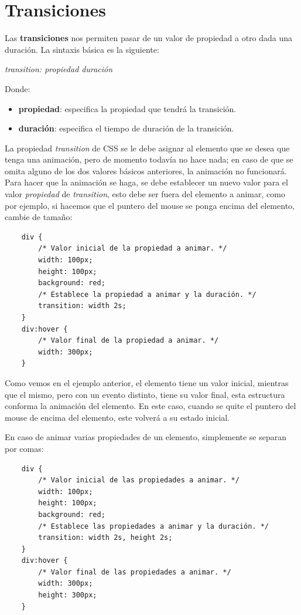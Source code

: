 \section{Transiciones}

Las \textbf{transiciones} nos permiten pasar de un valor de propiedad a otro dada una duración. La sintaxis básica es la siguiente:
\begin{center}
    \textit{transition: propiedad duración}
\end{center}

Donde:
\begin{itemize}
    \item \textbf{propiedad}: especifica la propiedad que tendrá la transición.
    \item \textbf{duración}: especifica el tiempo de duración de la transición.
\end{itemize}

La propiedad \textit{transition} de CSS se le debe asignar al elemento que se desea que tenga una animación, pero de momento todavía no hace nada; en caso de que se omita alguno de los dos valores básicos anteriores, la animación no funcionará. Para hacer que la animación se haga, se debe establecer un nuevo valor para el valor \textit{propiedad} de \textit{transition}, esto debe ser fuera del elemento a animar, como por ejemplo, si hacemos que el puntero del mouse se ponga encima del elemento, cambie de tamaño:
\begin{lstlisting}
    div {
        /* Valor inicial de la propiedad a animar. */
        width: 100px;
        height: 100px;
        background: red;
        /* Establece la propiedad a animar y la duración. */
        transition: width 2s;
    }
    div:hover {
        /* Valor final de la propiedad a animar. */
        width: 300px;
    }
\end{lstlisting}

Como vemos en el ejemplo anterior, el elemento tiene un valor inicial, mientras que el mismo, pero con un evento distinto, tiene su valor final, esta estructura conforma la animación del elemento. En este caso, cuando se quite el puntero del mouse de encima del elemento, este volverá a su estado inicial.

En caso de animar varias propiedades de un elemento, simplemente se separan por comas:
\begin{lstlisting}
    div {
        /* Valor inicial de las propiedades a animar. */
        width: 100px;
        height: 100px;
        background: red;
        /* Establece las propiedades a animar y la duración. */
        transition: width 2s, height 2s;
    }
    div:hover {
        /* Valor final de las propiedades a animar. */
        width: 300px;
        height: 300px;
    }
\end{lstlisting}


